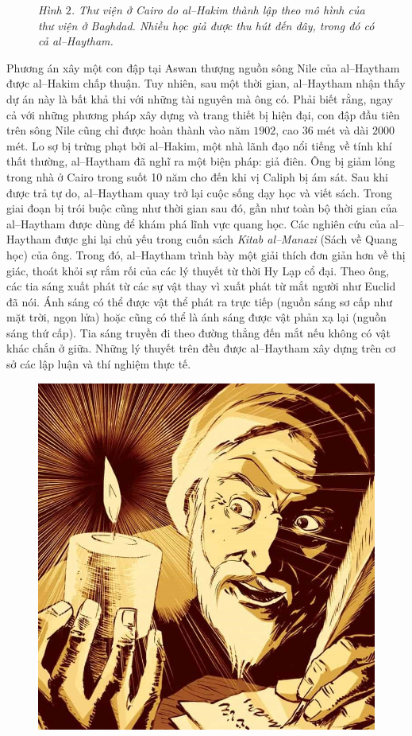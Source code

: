 \begin{multicols}{2}
\begin{figure}[H]
		\caption{\small\textit{\color{lichsutoanhoc}Hình $2$. Thư viện ở Cairo do al--Hakim thành lập theo mô hình của thư viện ở Baghdad. Nhiều học giả được thu hút đến đây, trong đó có cả al--Haytham.}}
		\vspace*{-10pt}
	\end{figure}
	Phương án xây một con đập tại Aswan thượng nguồn sông Nile của al--Haytham được al--Hakim chấp thuận. Tuy nhiên, sau một thời gian, al--Haytham nhận thấy dự án này là bất khả thi với những tài nguyên mà ông có. Phải biết rằng, ngay cả với những phương pháp xây dựng và trang thiết bị hiện đại, con đập đầu tiên trên sông Nile cũng chỉ được hoàn thành vào năm $1902$, cao $36$ mét và dài $2000$ mét. Lo sợ bị trừng phạt bởi al--Hakim, một nhà lãnh đạo nổi tiếng về tính khí thất thường, al--Haytham đã nghĩ ra một biện pháp: giả điên. Ông bị giảm lỏng trong nhà ở Cairo trong suốt 10 năm cho đến khi vị Caliph bị ám sát. Sau khi được trả tự do, al--Haytham quay trở lại cuộc sống dạy học và viết sách. Trong giai đoạn bị trói buộc cũng như thời gian sau đó, gần như toàn bộ thời gian của al--Haytham được dùng để khám phá lĩnh vực quang học.
	\vskip 0.1cm
	Các nghiên cứu của al--Haytham được ghi lại chủ yếu trong cuốn sách \textit{Kitab al--Manazi} (Sách về Quang học) của ông. Trong đó, al--Haytham trình bày một giải thích đơn giản hơn về thị giác, thoát khỏi sự rắm rối của các lý thuyết từ thời Hy Lạp cổ đại. Theo ông, các tia sáng xuất phát từ các sự vật thay vì xuất phát từ mắt người như Euclid đã nói. Ánh sáng có thể được vật thể phát ra trực tiếp (nguồn sáng sơ cấp như mặt trời, ngọn lửa) hoặc cũng có thể là ánh sáng được vật phản xạ lại (nguồn sáng thứ cấp). Tia sáng truyền đi theo đường thẳng đến mắt nếu không có vật khác chắn ở giữa. Những lý thuyết trên đều được al--Haytham xây dựng trên cơ sở các lập luận và thí nghiệm thực tế. 
	\begin{figure}[H]
		\vspace*{-5pt}
		\centering
		\captionsetup{labelformat= empty, justification=centering}
		\includegraphics[width= 0.75\linewidth]{4}

\end{figure}
\end{multicols}
